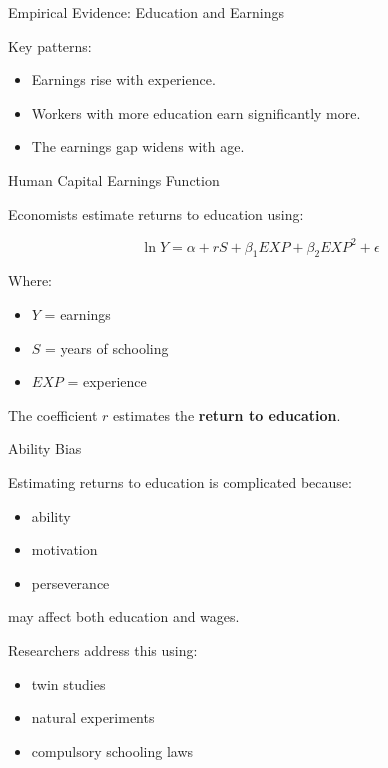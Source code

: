 \documentclass[aspectratio=169]{beamer}
\begin{document}
\begin{frame}{Empirical Evidence: Education and Earnings}

Key patterns:

\begin{itemize}
\item Earnings rise with experience.
\item Workers with more education earn significantly more.
\item The earnings gap widens with age.
\end{itemize}

\begin{center}
\end{center}
\end{frame}

\begin{frame}{Human Capital Earnings Function}

Economists estimate returns to education using:

\[
\ln Y = \alpha + rS + \beta_1 EXP + \beta_2 EXP^2 + \epsilon
\]

Where:

\begin{itemize}
\item $Y$ = earnings
\item $S$ = years of schooling
\item $EXP$ = experience
\end{itemize}

The coefficient $r$ estimates the \textbf{return to education}.
\end{frame}

\begin{frame}{Ability Bias}

Estimating returns to education is complicated because:

\begin{itemize}
\item ability
\item motivation
\item perseverance
\end{itemize}

may affect both education and wages.

Researchers address this using:

\begin{itemize}
\item twin studies
\item natural experiments
\item compulsory schooling laws
\end{itemize}
\end{frame}
\end{document}
